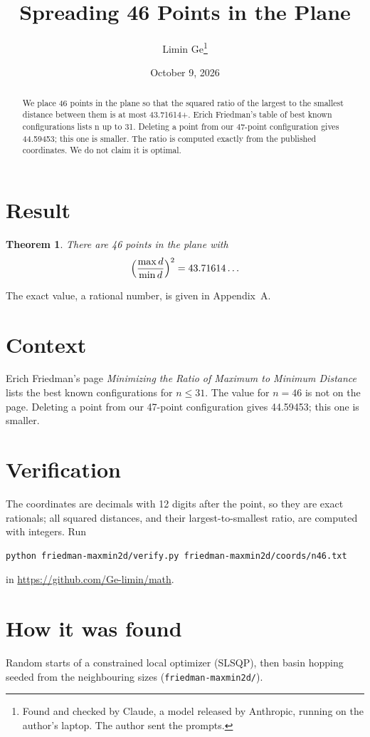 \documentclass[11pt,a4paper]{article}
\title{Spreading 46 Points in the Plane}
\author{Limin Ge\thanks{Found and checked by Claude, a model released by Anthropic, running on the author's laptop. The author sent the prompts.}}
\date{October 9, 2026}
\newtheorem*{theorem}{Theorem}
\begin{document}
\maketitle
\begin{abstract}
We place 46 points in the plane so that the squared ratio of the largest to the smallest distance between them is at most 43.71614+. Erich Friedman's table of best known configurations lists n up to 31. Deleting a point from our 47-point configuration gives 44.59453; this one is smaller. The ratio is computed exactly from the published coordinates. We do not claim it is optimal.
\end{abstract}

\section{Result}
\begin{theorem}
There are 46 points in the plane with
\[ \Bigl(\frac{\max d}{\min d}\Bigr)^2 = 43.71614\ldots \]
\end{theorem}
The exact value, a rational number, is given in Appendix~A.


\section{Context}
Erich Friedman's page \emph{Minimizing the Ratio of Maximum to Minimum Distance} lists the best known configurations for $n\le 31$. The value for $n=46$ is not on the page. Deleting a point from our 47-point configuration gives 44.59453; this one is smaller.


\section{Verification}
The coordinates are decimals with 12 digits after the point, so they are exact rationals; all squared distances, and their largest-to-smallest ratio, are computed with integers. Run
\begin{verbatim}
python friedman-maxmin2d/verify.py friedman-maxmin2d/coords/n46.txt
\end{verbatim}
in \url{https://github.com/Ge-limin/math}.


\section{How it was found}
Random starts of a constrained local optimizer (SLSQP), then basin hopping seeded from the neighbouring sizes (\texttt{friedman-maxmin2d/}).
\end{document}
